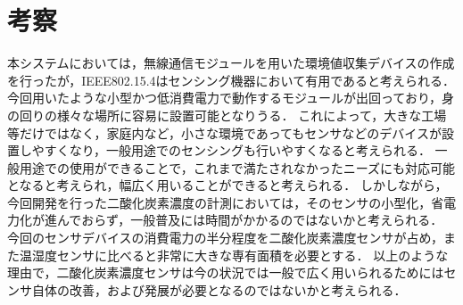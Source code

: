 

\section{考察}

本システムにおいては，無線通信モジュールを用いた環境値収集デバイスの作成を行ったが，IEEE802.15.4はセンシング機器において有用であると考えられる．
今回用いたような小型かつ低消費電力で動作するモジュールが出回っており，身の回りの様々な場所に容易に設置可能となりうる．
これによって，大きな工場等だけではなく，家庭内など，小さな環境であってもセンサなどのデバイスが設置しやすくなり，一般用途でのセンシングも行いやすくなると考えられる．
一般用途での使用ができることで，これまで満たされなかったニーズにも対応可能となると考えられ，幅広く用いることができると考えられる．
しかしながら，今回開発を行った二酸化炭素濃度の計測においては，そのセンサの小型化，省電力化が進んでおらず，一般普及には時間がかかるのではないかと考えられる．
今回のセンサデバイスの消費電力の半分程度を二酸化炭素濃度センサが占め，また温湿度センサに比べると非常に大きな専有面積を必要とする．
以上のような理由で，二酸化炭素濃度センサは今の状況では一般で広く用いられるためにはセンサ自体の改善，および発展が必要となるのではないかと考えられる．

